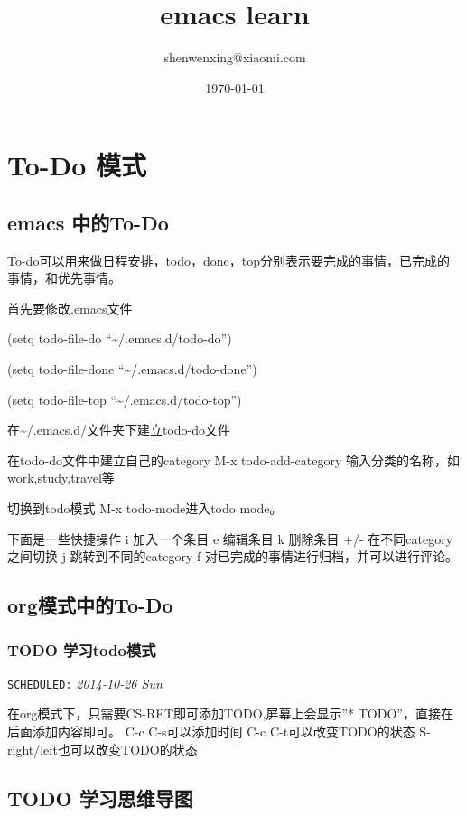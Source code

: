 \documentclass[11pt]{article}
\title{emacs learn}
\author{shenwenxing@xiaomi.com}
\date{\today}
\begin{document}
\maketitle

\setcounter{tocdepth}{3}
\tableofcontents
\vspace*{1cm}
\label{content-position}
\section{To-Do 模式}
\label{sec-1}
\subsection{emacs 中的To-Do}
\label{sec-1-1}


To-do可以用来做日程安排，todo，done，top分别表示要完成的事情，已完成的事情，和优先事情。

首先要修改.emacs文件

  (setq todo-file-do ``\~{}/.emacs.d/todo-do'')

  (setq todo-file-done ``\~{}/.emacs.d/todo-done'')

  (setq todo-file-top ``\~{}/.emacs.d/todo-top'')

在\~{}/.emacs.d/文件夹下建立todo-do文件

在todo-do文件中建立自己的category
M-x todo-add-category
输入分类的名称，如work,study,travel等

切换到todo模式
M-x todo-mode进入todo mode。

下面是一些快捷操作
i    加入一个条目
e    编辑条目
k    删除条目
+/-  在不同category之间切换
j    跳转到不同的category
f    对已完成的事情进行归档，并可以进行评论。
\subsection{org模式中的To-Do}
\label{sec-1-2}
\subsubsection{\textbf{TODO} 学习todo模式}
\label{sec-1-2-1}

  \texttt{SCHEDULED:} \textit{2014-10-26 Sun}

在org模式下，只需要CS-RET即可添加TODO,屏幕上会显示''* TODO''，直接在后面添加内容即可。
C-c C-s可以添加时间
C-c C-t可以改变TODO的状态
S-right/left也可以改变TODO的状态
\subsection{\textbf{TODO} 学习思维导图}
\label{sec-1-3}
\end{document}
